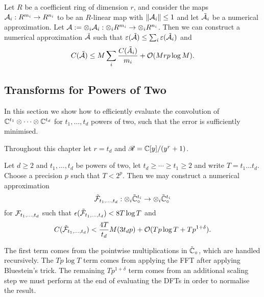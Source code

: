 \begin{lemma}\label{lem:tensor-products}
    Let $R$ be a coefficient ring of dimension $r$, and consider the maps $\mathcal A_i : R^{m_i} \to R^{n_i}$ to be an $R$-linear map with $\|\mathcal A_i\| \le 1$ and let $\tilde{\mathcal A_i}$ be a numerical approximation. Let $\mathcal A := \otimes_i \mathcal A_i : \otimes_i R^{m_i} \to \otimes_i R^{n_i}$. Then we can construct a numerical approximation $\tilde{\mathcal A}$ such that $\varepsilon(\tilde{\mathcal A}) \le \sum_i \varepsilon(\tilde{\mathcal A}_i)$ and
    \[
        C(\tilde{\mathcal A}) \le M \sum_i\frac{C(\tilde{A}_i)}{m_i} + \mathcal O(Mrp \log M).
    \]
\end{lemma}


\subsection{Transforms for Powers of Two}
\label{sub:transfoms-for-powers-of-two}

In this section we show how to efficiently evaluate the convolution of ${\mathbb C}^{t_1} \otimes \cdots \otimes {\mathbb C}^{t_d}$ for $t_1, \ldots, t_d$ powers of two, such that the error is sufficiently minimised.

Throughout this chapter let $r = t_d$ and $\mathscr{R} = {\mathbb C}[y] / (y^r + 1)$.

\begin{theorem}\label{thm:main-3}
    Let $d \geq 2$ and $t_1, \ldots, t_d$ be powers of two, let $t_d \geq \cdots \geq t_1 \geq 2$ and write $T = t_1 \ldots t_d$. Choose a precision $p$ such that $T < 2^p$. Then we may construct a numerical approximation
    \[
        \tilde {\mathcal F}_{t_1, \ldots, t_d} : \otimes_i \tilde{{\mathbb C}}^{t_i}_\circ \to \otimes_i \tilde{{\mathbb C}}^{t_i}_\circ
    \]
    for $\mathcal F_{t_1, \ldots, t_d}$ such that $\epsilon(\tilde{\mathcal F}_{t_1, \ldots, t_d}) < 8 T \log T$ and
    \[
        C(\tilde{\mathcal F}_{t_1, \ldots, t_d}) < \frac{4T}{t_d} M(3t_d p) + \mathcal O(Tp\log T + Tp^{1 + \delta}).
    \]
\end{theorem}

The first term comes from the pointwise multiplications in $\tilde{{\mathbb C}}_\circ$, which are handled recursively. The $Tp \log T$ term comes from applying the FFT after applying Bluestein's trick. The remaining $Tp^{1 + \delta}$ term comes from an additional scaling step we must perform at the end of evaluating the DFTs in order to normalise the result.

